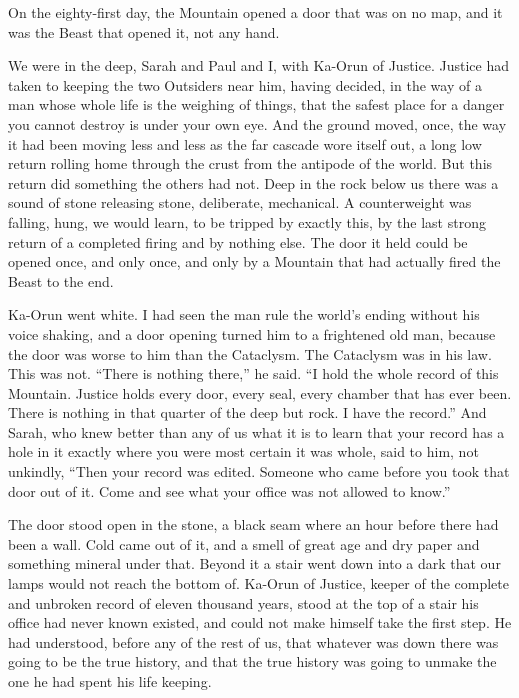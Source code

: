 \ornament

On the eighty-first day, the Mountain opened a door that was on no map, and it was the Beast that opened it, not any hand.\par

We were in the deep, Sarah and Paul and I, with Ka-Orun of Justice. Justice had taken to keeping the two Outsiders near him, having decided, in the way of a man whose whole life is the weighing of things, that the safest place for a danger you cannot destroy is under your own eye. And the ground moved, once, the way it had been moving less and less as the far cascade wore itself out, a long low return rolling home through the crust from the antipode of the world. But this return did something the others had not. Deep in the rock below us there was a sound of stone releasing stone, deliberate, mechanical. A counterweight was falling, hung, we would learn, to be tripped by exactly this, by the last strong return of a completed firing and by nothing else. The door it held could be opened once, and only once, and only by a Mountain that had actually fired the Beast to the end.\par

Ka-Orun went white. I had seen the man rule the world's ending without his voice shaking, and a door opening turned him to a frightened old man, because the door was worse to him than the Cataclysm. The Cataclysm was in his law. This was not. ``There is nothing there,'' he said. ``I hold the whole record of this Mountain. Justice holds every door, every seal, every chamber that has ever been. There is nothing in that quarter of the deep but rock. I have the record.'' And Sarah, who knew better than any of us what it is to learn that your record has a hole in it exactly where you were most certain it was whole, said to him, not unkindly, ``Then your record was edited. Someone who came before you took that door out of it. Come and see what your office was not allowed to know.''\par

The door stood open in the stone, a black seam where an hour before there had been a wall. Cold came out of it, and a smell of great age and dry paper and something mineral under that. Beyond it a stair went down into a dark that our lamps would not reach the bottom of. Ka-Orun of Justice, keeper of the complete and unbroken record of eleven thousand years, stood at the top of a stair his office had never known existed, and could not make himself take the first step. He had understood, before any of the rest of us, that whatever was down there was going to be the true history, and that the true history was going to unmake the one he had spent his life keeping.\par

